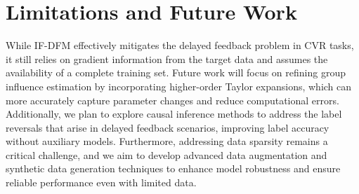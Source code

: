 \section{Limitations and Future Work}
{
While IF-DFM effectively mitigates the delayed feedback problem in CVR tasks, it still relies on gradient information from the target data and assumes the availability of a complete training set. Future work will focus on refining group influence estimation by incorporating higher-order Taylor expansions, which can more accurately capture parameter changes and reduce computational errors. Additionally, we plan to explore causal inference methods to address the label reversals that arise in delayed feedback scenarios, improving label accuracy without auxiliary models. Furthermore, addressing data sparsity remains a critical challenge, and we aim to develop advanced data augmentation and synthetic data generation techniques to enhance model robustness and ensure reliable performance even with limited data.}